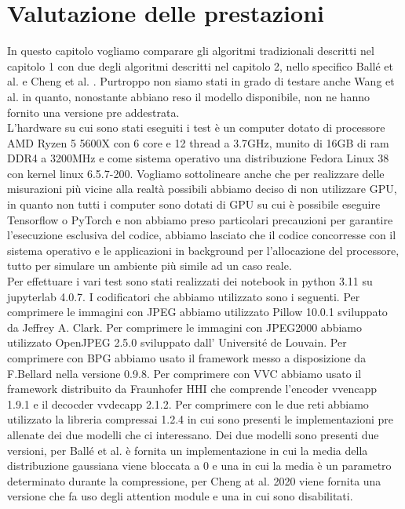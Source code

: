 \chapter{Valutazione delle prestazioni}
In questo capitolo vogliamo comparare gli algoritmi tradizionali descritti nel capitolo 1 con due degli algoritmi descritti nel capitolo 2, nello specifico Ballé et al. \cite{minnen2018joint} e Cheng et al. \cite{cheng2020learned}. Purtroppo non siamo stati in grado di testare anche Wang et al. \cite{wang2022neural} in quanto, nonostante abbiano reso il modello disponibile, non ne hanno fornito una versione pre addestrata.\\
L’hardware su cui sono stati eseguiti i test è un computer dotato di processore AMD Ryzen 5 5600X con 6 core e 12 thread a 3.7GHz, munito di 16GB di ram DDR4 a 3200MHz e come sistema operativo una distribuzione Fedora Linux 38 con kernel linux 6.5.7-200. Vogliamo sottolineare anche che per realizzare delle misurazioni più vicine alla realtà possibili abbiamo deciso di non utilizzare GPU, in quanto non tutti i computer sono dotati di GPU su cui è possibile eseguire Tensorflow o PyTorch e non abbiamo preso particolari precauzioni per garantire l’esecuzione esclusiva del codice, abbiamo lasciato che il codice concorresse con il sistema operativo e le applicazioni in background per l’allocazione del processore, tutto per simulare un ambiente più simile ad un caso reale.\\
Per effettuare i vari test sono stati realizzati dei notebook in python 3.11 su jupyterlab 4.0.7. I codificatori che abbiamo utilizzato sono i seguenti. Per comprimere le immagini con JPEG abbiamo utilizzato Pillow 10.0.1 \cite{PillowLibrary} sviluppato da Jeffrey A. Clark. Per comprimere le immagini con JPEG2000 abbiamo utilizzato OpenJPEG 2.5.0 \cite{OpenJPEGLibrary} sviluppato dall’ Université de Louvain. Per comprimere con BPG abbiamo usato il framework messo a disposizione da F.Bellard \cite{BPGImageformat} nella versione 0.9.8. Per comprimere con VVC abbiamo usato il framework distribuito da Fraunhofer HHI \cite{VVCLibrary} che comprende l’encoder vvencapp 1.9.1 e il decocder vvdecapp 2.1.2. Per comprimere con le due reti abbiamo utilizzato la libreria compressai 1.2.4 \cite{CompressAILibrary} in cui sono presenti le implementazioni pre allenate dei due modelli che ci interessano. Dei due modelli sono presenti due versioni, per Ballé et al. \cite{minnen2018joint} è fornita un implementazione in cui la media della distribuzione gaussiana viene bloccata a 0 e una in cui la media è un parametro determinato durante la compressione, per Cheng at al. 2020 \cite{cheng2020learned} viene fornita una versione che fa uso degli attention module e una in cui sono disabilitati.\\
